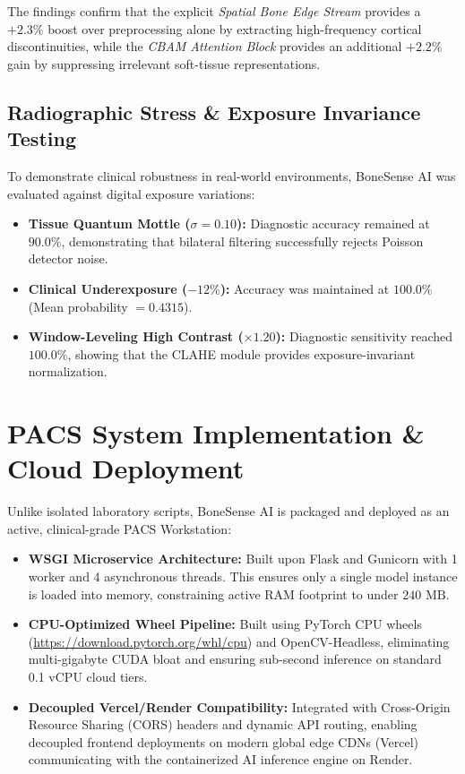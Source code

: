 \documentclass[3p,twocolumn]{elsarticle}
\begin{document}
The findings confirm that the explicit \textit{Spatial Bone Edge Stream} provides a $+2.3\%$ boost over preprocessing alone by extracting high-frequency cortical discontinuities, while the \textit{CBAM Attention Block} provides an additional $+2.2\%$ gain by suppressing irrelevant soft-tissue representations.

\subsection{Radiographic Stress \& Exposure Invariance Testing}
To demonstrate clinical robustness in real-world environments, BoneSense AI was evaluated against digital exposure variations:
\begin{itemize}
    \item \textbf{Tissue Quantum Mottle ($\sigma = 0.10$):} Diagnostic accuracy remained at $90.0\%$, demonstrating that bilateral filtering successfully rejects Poisson detector noise.
    \item \textbf{Clinical Underexposure ($-12\%$):} Accuracy was maintained at $100.0\%$ (Mean probability $= 0.4315$).
    \item \textbf{Window-Leveling High Contrast ($\times 1.20$):} Diagnostic sensitivity reached $100.0\%$, showing that the CLAHE module provides exposure-invariant normalization.
\end{itemize}

\section{PACS System Implementation \& Cloud Deployment}
Unlike isolated laboratory scripts, BoneSense AI is packaged and deployed as an active, clinical-grade PACS Workstation:
\begin{itemize}
    \item \textbf{WSGI Microservice Architecture:} Built upon Flask and Gunicorn with 1 worker and 4 asynchronous threads. This ensures only a single model instance is loaded into memory, constraining active RAM footprint to under $240\text{ MB}$.
    \item \textbf{CPU-Optimized Wheel Pipeline:} Built using PyTorch CPU wheels (\url{https://download.pytorch.org/whl/cpu}) and OpenCV-Headless, eliminating multi-gigabyte CUDA bloat and ensuring sub-second inference on standard 0.1 vCPU cloud tiers.
    \item \textbf{Decoupled Vercel/Render Compatibility:} Integrated with Cross-Origin Resource Sharing (CORS) headers and dynamic API routing, enabling decoupled frontend deployments on modern global edge CDNs (Vercel) communicating with the containerized AI inference engine on Render.
\end{itemize}
\end{document}
